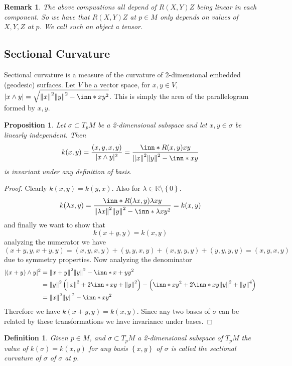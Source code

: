 \documentclass[a4paper]{article}
\newtheorem*{prop}{Proposition}
\newtheorem*{defn}{Definition}
\newtheorem*{rem}{Remark}
\begin{document}
\begin{rem}
  The above compuations all depend of $R(X,Y)Z$ being linear in each component. So we have that $R(X,Y)Z$ at $p \in M$ only depends on values of $X,Y,Z$ at $p$. We call such an object a tensor.
\end{rem}

\subsection*{Sectional Curvature}%
Sectional curvature is a measure of the curvature of 2-dimensional embedded (geodesic) surfaces. Let $V$ be a vector space, for $x,y \in V$, $| x \wedge y| = \sqrt{\norm{x}^2\norm{y}^2 - \inn*{x}{y}^2}$. This is simply the area of the parallelogram formed by $x,y$. 

\begin{prop}
  Let $\sigma \subset T_pM$ be a 2-dimensional subspace and let $x,y \in \sigma$ be linearly independent. Then
  \[
    k(x,y) =  \frac{(x,y,x,y)}{|x \wedge y|^2} = \frac{\inn*{R(x,y)x}{y}}{\norm{x}^2\norm{y}^2 - \inn*{x}{y}}
  \]
  is invariant under any definition of basis.
\end{prop}
\begin{proof}
  Clearly $k(x,y) = k(y,x)$. Also for $\lambda \in \mathds{R} \setminus \left\{ 0 \right\}$.
  \[
    k(\lambda x, y) = \frac{\inn*{R(\lambda x, y) \lambda x}{y}}{\norm{\lambda x}^2 \norm{y}^2 - \inn*{\lambda x}{y}^2} = k(x,y)
  \]
  and finally we want to show that
  \[
    k(x + y, y) = k(x,y) 
  \]
  analyzing the numerator we have
  \[
    (x + y, y, x+y, y) = (x,y, x,y) + (y,y,x,y) + (x,y,y,y) + (y,y,y,y) = (x,y,x,y)
  \]
  due to symmetry properties. Now analyzing the denominator
  \[
    \begin{aligned}
      |(x + y) \wedge y|^2 &= \norm{x + y}^2 \norm{y}^2 - \inn*{x+y}{y}^2 \\ 
                           &= \norm{y}^2 \left( \norm{x}^2 + 2 \inn*{x}{y} + \norm{y}^2 \right) - \left( \inn*{x}{y}^2 + 2 \inn*{x}{y} \norm{y}^2 + \norm{y}^4 \right) \\
                           &= \norm{x}^2\norm{y}^2 - \inn*{x}{y}^2
    \end{aligned}
  \]
  Therefore we have $k(x+y,y) = k(x,y)$. Since any two bases of $\sigma$ can be related by these transformations we have invariance under bases.
\end{proof}

\begin{defn}
  Given $p \in M$, and $\sigma \subset T_pM$ a 2-dimensional subspace of $T_pM$ the value of $k(\sigma) = k(x,y)$ for any basis $\left\{ x,y \right\}$ of $\sigma$ is called the sectional curvature of $\sigma$ of $\sigma$ at $p$.
\end{defn}
\end{document}
